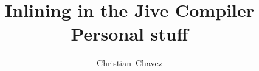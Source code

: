 \documentclass[a4paper]{article}
\begin{document}
\title{Inlining in the Jive Compiler \\
Personal stuff}
\author{Christian~Chavez}
\maketitle



\clearpage

\end{document}
